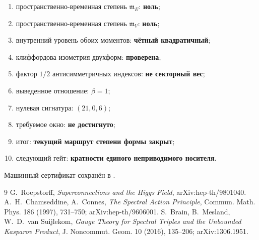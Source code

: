 \begin{protocol}
\begin{enumerate}
 \item пространственно-временная степень $\mathfrak m_E$: \textbf{ноль};
 \item пространственно-временная степень $\mathfrak m_V$: \textbf{ноль};
 \item внутренний уровень обоих моментов: \textbf{чётный квадратичный};
 \item клиффордова изометрия двухформ: \textbf{проверена};
 \item фактор $1/2$ антисимметричных индексов: \textbf{не секторный вес};
 \item выведенное отношение: \textbf{$\beta=1$};
 \item нулевая сигнатура: \textbf{$(21,0,6)$};
 \item требуемое окно: \textbf{не достигнуто};
 \item итог: \textbf{текущий маршрут степени формы закрыт};
 \item следующий гейт: \textbf{кратности единого неприводимого носителя}.
\end{enumerate}
\end{protocol}

Машинный сертификат сохранён в
.

\begin{thebibliography}{9}
G.~Roepstorff,
\emph{Superconnections and the Higgs Field}, arXiv:hep-th/9801040.
A.~H.~Chamseddine, A.~Connes,
\emph{The Spectral Action Principle},
Commun. Math. Phys. 186 (1997), 731--750; arXiv:hep-th/9606001.
S.~Brain, B.~Mesland, W.~D.~van Suijlekom,
\emph{Gauge Theory for Spectral Triples and the Unbounded Kasparov Product},
J. Noncommut. Geom. 10 (2016), 135--206; arXiv:1306.1951.
\end{thebibliography}